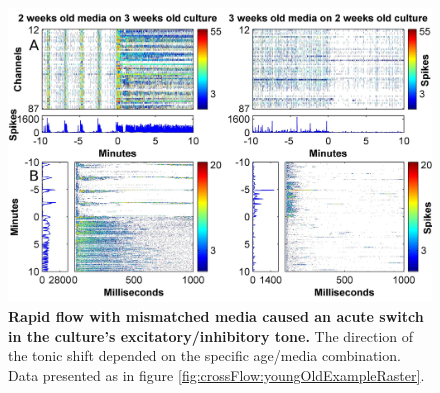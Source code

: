         \begin{figure}[!htb]
            \centering
            \includegraphics[width=15cm]{chapter5/figures/toneRasterExample/toneRasterExample.jpg}
            \caption[Examples for the effect of a mismatch between the media age and the culture age]{\textbf{Rapid flow with mismatched media caused an acute switch in the culture's excitatory/inhibitory tone.} The direction of the tonic shift depended on the specific age/media combination. Data presented as in figure \ref{fig:crossFlow:youngOldExampleRaster}.}
            \label{fig:crossFlow:toneExampleRaster}
        \end{figure}


